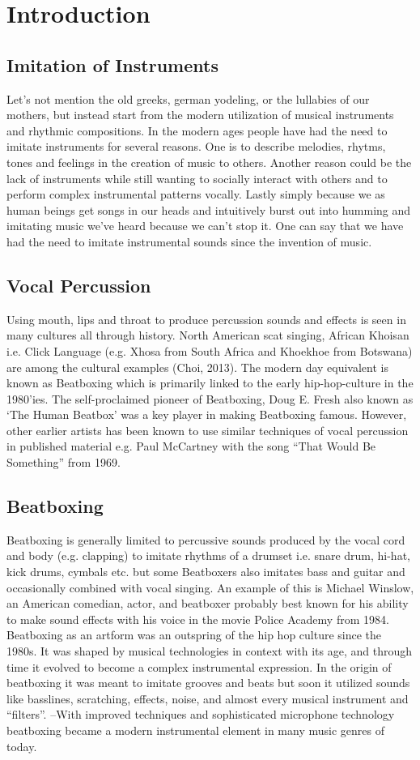 \section{ Introduction }
\subsection{ Imitation of Instruments }
Let’s not mention the old greeks, german yodeling, or the lullabies of our mothers, but instead start from the modern utilization of musical instruments and rhythmic compositions. In the modern ages people have had the need to imitate instruments for several reasons. One is to describe melodies, rhytms, tones and feelings in the creation of music to others. Another reason could be the lack of instruments while still wanting to socially interact with others and to perform complex instrumental patterns vocally. Lastly simply because we as human beings get songs in our heads and intuitively burst out into humming and imitating music we’ve heard because we can’t stop it. One can say that we have had the need to imitate instrumental sounds since the invention of music.
\subsection{ Vocal Percussion }
Using mouth, lips and throat to produce percussion sounds and effects is seen in many cultures all through history. North American scat singing, African Khoisan i.e. Click Language (e.g. Xhosa from South Africa and Khoekhoe from Botswana) are among the cultural examples (Choi, 2013).	
The modern day equivalent is known as Beatboxing which is primarily linked to the early hip-hop-culture in the 1980’ies. The self-proclaimed pioneer of Beatboxing, Doug E. Fresh also known as ‘The Human Beatbox’ was a key player in making Beatboxing famous. However, other earlier artists has been known to use similar techniques of vocal percussion in published material e.g. Paul McCartney with the song “That Would Be Something” from 1969.
\subsection{ Beatboxing }
Beatboxing is generally limited to percussive sounds produced by the vocal cord and body (e.g. clapping) to imitate rhythms of a drumset i.e. snare drum, hi-hat, kick drums, cymbals etc. but some Beatboxers also imitates bass and guitar and occasionally combined with vocal singing. An example of this is Michael Winslow, an American comedian, actor, and beatboxer probably best known for his ability to make sound effects with his voice in the movie Police Academy from 1984. Beatboxing as an artform was an outspring of the hip hop culture since the 1980s. It was shaped by musical technologies in context with its age, and through time it evolved to become a complex instrumental expression. In the origin of beatboxing it was meant to imitate grooves and beats but soon it utilized sounds like basslines, scratching, effects, noise, and almost every musical instrument and “filters”. –With improved techniques and sophisticated microphone technology beatboxing became a modern instrumental element in many music genres of today.

